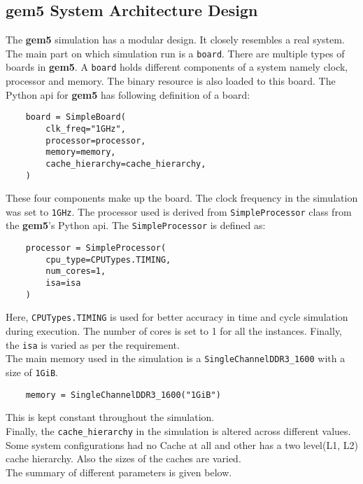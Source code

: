 \subsection{gem5 System Architecture Design}
The \textbf{gem5} simulation has a modular design. It closely resembles a real system. The main part on which
simulation run is a \texttt{board}. There are multiple types of boards in \textbf{gem5}. A \texttt{board} 
holds different components of a system namely clock, processor and memory. The binary resource is also loaded
to this board. The Python api for \textbf{gem5} has following definition of a board:
\begin{verbatim}
    board = SimpleBoard(
        clk_freq="1GHz",
        processor=processor,
        memory=memory,
        cache_hierarchy=cache_hierarchy,
    )
\end{verbatim}
These four components make up the board. The clock frequency in the simulation was set to \texttt{1GHz}.
The processor used is derived from \texttt{SimpleProcessor} class from the \textbf{gem5}'s Python api.
The \texttt{SimpleProcessor} is defined as:
\begin{verbatim}
    processor = SimpleProcessor(
        cpu_type=CPUTypes.TIMING,
        num_cores=1,
        isa=isa
    )
\end{verbatim}
Here, \texttt{CPUTypes.TIMING} is used for better accuracy in time and cycle simulation during execution.
The number of cores is set to 1 for all the instances. Finally, the \texttt{isa} is varied as per the requirement.\\
The main memory used in the simulation is a \texttt{SingleChannelDDR3\_1600} with a size of \texttt{1GiB}.
\begin{verbatim}
    memory = SingleChannelDDR3_1600("1GiB")
\end{verbatim}
This is kept constant throughout the simulation.\\
Finally, the \texttt{cache\_hierarchy} in the simulation is altered across different values. Some system configurations
had no Cache at all and other has a two level(L1, L2) cache hierarchy. Also the sizes of the caches are varied.\\
The summary of different parameters is given below.

